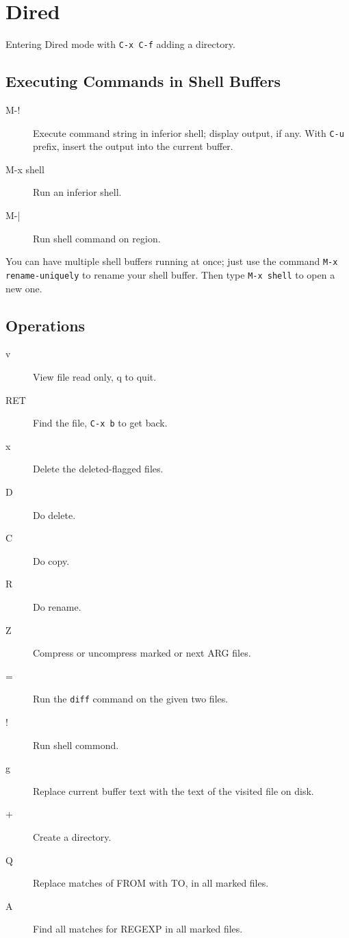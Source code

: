 \chapter{Dired}

Entering Dired mode with \verb|C-x C-f| adding a directory.

\section{Executing Commands in Shell Buffers}

\begin{description}
\item[M-!] Execute command string in inferior shell; display output, if any. With \verb|C-u| prefix, insert the output into the current buffer.
\item[M-x shell] Run an inferior shell.
\item[M-|] Run shell command on region.
\end{description}

You can have multiple shell buffers running at once; just use the command \verb|M-x rename-uniquely| to rename your shell buffer.
Then type \verb|M-x shell| to open a new one.



\section{Operations}
\begin{description}
\item[v] View file read only, q to quit.
\item[RET] Find the file, \verb|C-x b| to get back.
\item[x] Delete the deleted-flagged files.
\item[D] Do delete.
\item[C] Do copy.
\item[R] Do rename.
\item[Z] Compress or uncompress marked or next ARG files.
\item[=] Run the \verb|diff| command on the given two files.
\item[!] Run shell commond.
\item[g] Replace current buffer text with the text of the visited file on disk.
\item[+] Create a directory.
\item[Q] Replace matches of FROM with TO, in all marked files.
\item[A] Find all matches for REGEXP in all marked files.
\end{description}

